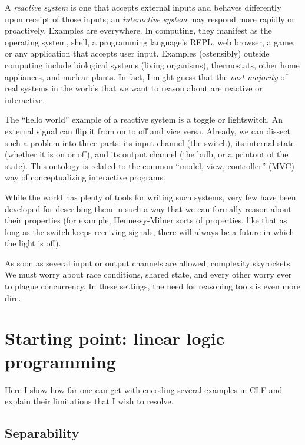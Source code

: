 \documentclass{article}
\begin{document}
A {\em reactive system} is one that accepts external inputs and behaves
differently upon receipt of those inputs; an {\em interactive system} may
respond more rapidly or proactively. Examples are everywhere. In computing,
they manifest as the operating system, shell, a programming language's
REPL, web browser, a game, or any application that accepts user input.
Examples (ostensibly) outside computing include biological systems (living
organisms), thermostats, other home appliances, and nuclear plants.  In
fact, I might guess that the {\em vast majority} of real systems in the
worlds that we want to reason about are reactive or interactive.

The ``hello world'' example of a reactive system is a toggle or
lightswitch. An external signal can flip it from on to off and vice versa.
Already, we can dissect such a problem into three parts: its input channel (the
switch), its internal state (whether it is on or off), and its output
channel (the bulb, or a printout of the state). This ontology is related to
the common ``model, view, controller'' (MVC) way of conceptualizing
interactive programs.

While the world has plenty of tools for writing such systems, very few have
been developed for describing them in such a way that we can formally
reason about their properties (for example, Hennessy-Milner sorts of
properties, like that as long as the switch keeps receiving signals, there
will always be a future in which the light is off).

As soon as several input or output channels are allowed, complexity
skyrockets. We must worry about race conditions, shared state, and every
other worry ever to plague concurrency. In these settings, the need for
reasoning tools is even more dire.

\section{Starting point: linear logic programming}


Here I show how far one can get with encoding several examples in CLF
and explain their limitations that I wish to resolve.

\subsection{Separability}
\end{document}
